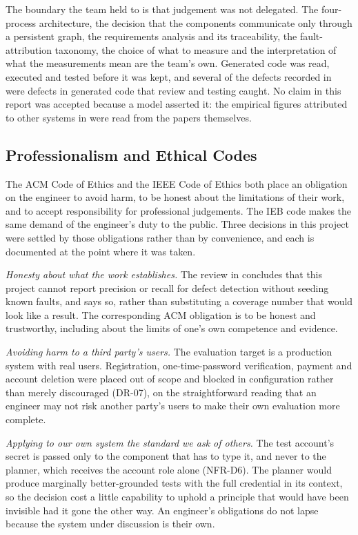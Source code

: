 The boundary the team held to is that judgement was not delegated. The
four-process architecture, the decision that the components communicate only
through a persistent graph, the requirements analysis and its traceability, the
fault-attribution taxonomy, the choice of what to measure and the
interpretation of what the measurements mean are the team's own. Generated code
was read, executed and tested before it was kept, and several of the defects
recorded in  were defects in generated code that review and
testing caught. No claim in this report was accepted because a model asserted
it: the empirical figures attributed to other systems in  were
read from the papers themselves.


\subsection{Professionalism and Ethical Codes}
\label{sec:codes}

The ACM Code of Ethics and the IEEE Code of Ethics both place an obligation on
the engineer to avoid harm, to be honest about the limitations of their work,
and to accept responsibility for professional judgements. The IEB code makes
the same demand of the engineer's duty to the public. Three decisions in this
project were settled by those obligations rather than by convenience, and each
is documented at the point where it was taken.

\emph{Honesty about what the work establishes.} The review in
 concludes that this project cannot report precision or
recall for defect detection without seeding known faults, and says so, rather
than substituting a coverage number that would look like a result. The
corresponding ACM obligation is to be honest and trustworthy, including about
the limits of one's own competence and evidence.

\emph{Avoiding harm to a third party's users.} The evaluation target is a
production system with real users. Registration, one-time-password
verification, payment and account deletion were placed out of scope and blocked
in configuration rather than merely discouraged (DR-07), on the straightforward
reading that an engineer may not risk another party's users to make their own
evaluation more complete.

\emph{Applying to our own system the standard we ask of others.} The test account's secret is passed only to the component that has to type it, and never to the planner, which receives the account role alone (NFR-D6). The planner would produce marginally better-grounded tests with the full credential in its context, so the decision cost a little capability to uphold a principle that would have been invisible had it gone the other way. An engineer's obligations do not lapse because the system under discussion is their own.
